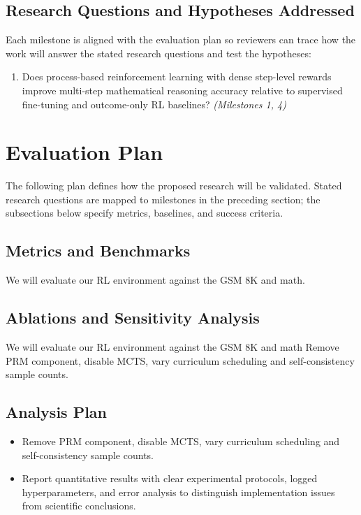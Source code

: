 \documentclass[11pt]{article}
\begin{document}
\subsection*{Research Questions and Hypotheses Addressed}
\noindent Each milestone is aligned with the evaluation plan so reviewers can trace how the work will answer the stated research questions and test the hypotheses:\par\vspace{0.4em}
\begin{enumerate}[label=\textbf{RQ\arabic*.},leftmargin=2.4em,itemsep=0.35em,parsep=0pt,topsep=0.35em]
  \item Does process-based reinforcement learning with dense step-level rewards improve multi-step mathematical reasoning accuracy relative to supervised fine-tuning and outcome-only RL baselines? \textit{(Milestones 1, 4)}
\end{enumerate}
\section{Evaluation Plan}
\noindent The following plan defines how the proposed research will be validated. Stated research questions are mapped to milestones in the preceding section; the subsections below specify metrics, baselines, and success criteria.\par\vspace{0.6em}
\subsection*{Metrics and Benchmarks}
We will evaluate our RL environment against the GSM 8K and math.

\subsection*{Ablations and Sensitivity Analysis}
We will evaluate our RL environment against the GSM 8K and math Remove PRM component, disable MCTS, vary curriculum scheduling and self-consistency sample counts.

\subsection*{Analysis Plan}
\begin{itemize}[leftmargin=*,itemsep=0.35em,parsep=0pt,topsep=0.35em,partopsep=0pt]
  \item Remove PRM component, disable MCTS, vary curriculum scheduling and self-consistency sample counts.
  \item Report quantitative results with clear experimental protocols, logged hyperparameters, and error analysis to distinguish implementation issues from scientific conclusions.
\end{itemize}
\end{document}
